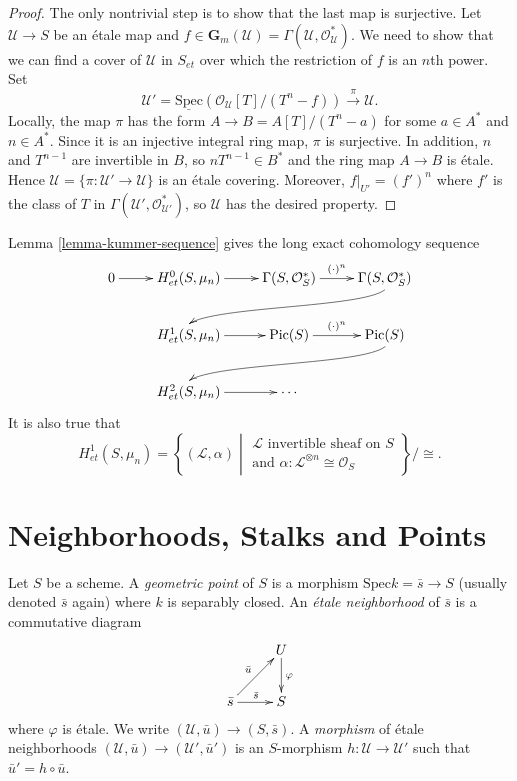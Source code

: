 \begin{proof}
The only nontrivial step is to show that the last map is surjective. Let 
$\mathcal{U} \to S$ be an \'etale map and $f \in \mathbf{G}_m(\mathcal{U}) = 
\Gamma(\mathcal{U}, \mathcal{O}_\mathcal{U}^*)$. We need to show that we can 
find a cover of $\mathcal{U}$ in $S_{et}$ over which the restriction of $f$ is 
an $n$th power. Set
$$
\mathcal{U}' = \underline{\text{Spec}} (\mathcal{O}_\mathcal{U}[T] / (T^n-f)) 
\xrightarrow{\pi} \mathcal{U}.
$$ 
Locally,  the map $\pi$ has the form $A \to B = A[T] / (T^n-a)$ for some $a \in 
A^*$ and $n \in A^*$. Since it is an injective integral ring map, $\pi$ is 
surjective. In addition, $n$ and $T^{n-1}$ are invertible in $B$, so $nT^{n-1} 
\in B^*$ and the ring map $A \to B$ is \'etale. Hence $\mathcal{U} = \{\pi : 
\mathcal{U}' \to \mathcal{U}\}$ is an \'etale covering. Moreover, $f|_{U'} = 
(f')^n$ where $f'$ is the class of $T$ in $\Gamma(\mathcal{U}', 
\mathcal{O}_{\mathcal{U}'}^*)$, so $\mathcal{U}$ has the desired property.  
\end{proof}

\noindent
Lemma \ref{lemma-kummer-sequence} gives the long exact cohomology sequence
$$
\xymatrix{
0  \ar[r] & H_{et}^0(S, \mu_n) \ar[r] & \Gamma(S, \mathcal{O}_S^*) 
\ar^{(\cdot)^n}[r] & \Gamma(S, \mathcal{O}_S^*) 
\ar@(rd,ul)[rdllllr]
\\ 
& H_{et}^1(S, \mu_n) \ar[r] & \text{Pic}(S) \ar^{(\cdot)^n}[r] & \text{Pic} (S) 
\ar@(rd,ul)[rdllllr] \\
& H_{et}^2(S, \mu_n) \ar[r] & \cdots 
}
$$
It is also true that
$$
H_{et}^1(S, \mu_n) = \left\{(\mathcal{L}, \alpha)\; 
\left| \; 
\begin{matrix}
\mathcal{L}\text{ invertible sheaf on } S  \\
\text{and }\alpha: \mathcal{L}^{\otimes n} \cong \mathcal{O}_S
\end{matrix}
\right.
\right\}
\Big/\cong.
$$




\section{Neighborhoods, Stalks and Points}
\label{section-stalks}

\begin{definition}
\label{definition-geometric-point}
Let $S$ be a scheme. A {\it geometric point} of $S$ is a morphism $\text{Spec} 
k = \bar s \to S$ (usually denoted $\bar s$ again)  where $k$ is separably 
closed. An {\it \'etale neighborhood} of $\bar s$ is a commutative diagram
$$
\xymatrix{
& U \ar^{\varphi}[d] \\
{\bar s} \ar^{\bar s}[r] \ar^{\bar u}[ur] & S 
}
$$
where $\varphi$ is \'etale. We write $(\mathcal{U}, \bar u)\to (S, \bar s)$. A 
{\it morphism} of \'etale neighborhoods $(\mathcal{U}, \bar u)\to 
(\mathcal{U}',\bar u')$ is an $S$-morphism $h: \mathcal{U}\to \mathcal{U}'$ 
such that $\bar u'=h\circ\bar u$. 
\end{definition}

